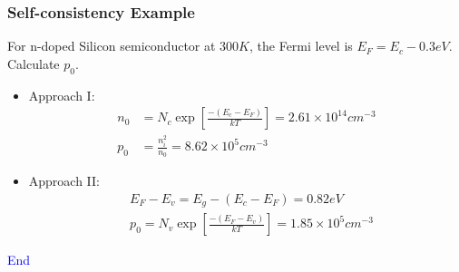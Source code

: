 \documentclass{beamer}
\begin{document}
    \begin{frame} \frametitle{Self-consistency Example}
        For n-doped Silicon semiconductor at $300K$, the Fermi level is $E_F = E_c - 0.3eV$. Calculate $p_0$.
        \begin{itemize}
            \item Approach I:
                \begin{equation*}
                    \begin{aligned}
                        n_0 &= N_c \exp \left[ \frac{-(E_c - E_F)}{kT}  \right] = 2.61 \times 10^{14} cm^{-3}\\
                        p_0 &= \frac{n_i^2}{n_0} = 8.62 \times 10^{5} cm^{-3}
                    \end{aligned}
                \end{equation*}
            \item Approach II:
                \begin{equation*}
                    \begin{aligned}
                        &E_F - E_v = E_g - (E_c - E_F) = 0.82 eV \\
                        &p_0 = N_v \exp\left[ \frac{-(E_F - E_v)}{kT}  \right] = 1.85 \times 10^5 cm^{-3}
                    \end{aligned}
                \end{equation*}
        \end{itemize}
    \end{frame}

    \begin{frame} 
        \begin{center}
            \Large\textcolor{blue}{End}
        \end{center}
    \end{frame}
\end{document}
